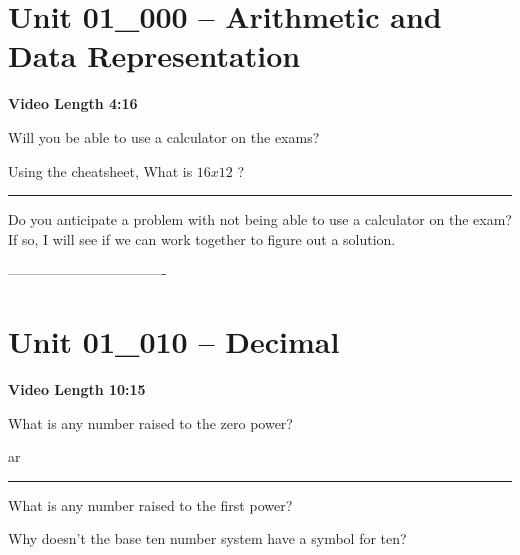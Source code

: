 \documentclass[letterpaper,12pt]{exam}
\newcommand{\unit}{Unit 01}
\begin{document}
\section*{\unit\_000 -- Arithmetic and Data Representation} 
\par{\selectfont\textbf{Video Length 4:16 }}
\begin{questions}

\begin{samepage}
    \question Will you be able to use a calculator on the exams?
    \vspace{5mm}
\end{samepage}
\par
 

 \begin{samepage} 
     \question Using the cheatsheet, What is $ 16 x 12 $ ? \rule{2cm}{0.15mm}     \vspace{5mm}
 \end{samepage}
 \par
 \begin{samepage}
     \question Do you anticipate a problem with not being able to use a calculator on the exam?  If so, I will see if we can work together to figure out a solution.
     \vspace{5mm}
 \end{samepage}
 \par
   
----------------------------------
\section*{\unit\_010 -- Decimal }
\par{\selectfont\textbf{Video Length 10:15}}
\begin{samepage}
    \question What is any number raised to the zero power?
    \vspace{5mm}
\end{samepage}
ar
\rule{0.5\textwidth}{.4pt} %

\begin{samepage}
    \question What is any number raised to the first power?
    \vspace{5mm}
\end{samepage}
\par
 

\begin{samepage}
    \question Why doesn't the base ten number system have a symbol for ten?
    \vspace{5mm}
\end{samepage}
\par
 

\end{questions}
\end{document}
